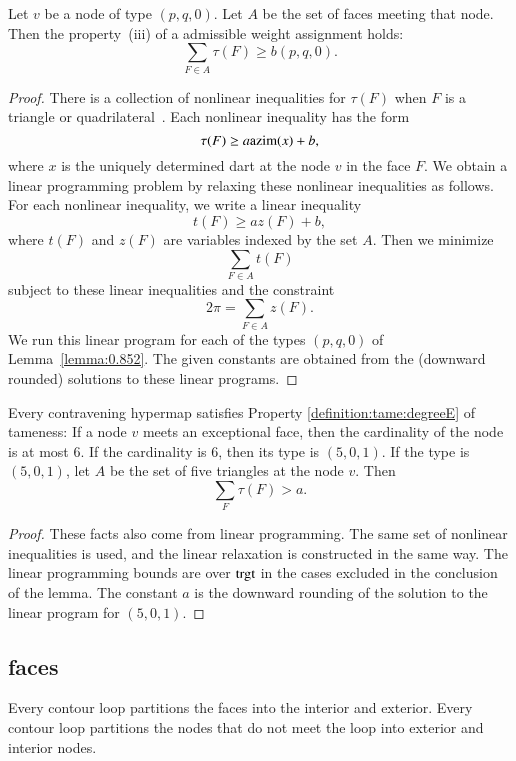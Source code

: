 \begin{lemma} Let $v$ be a node of type $(p,q,0)$.  Let $A$
be the set of faces meeting that node.  Then the property~(iii)
of a admissible weight assignment holds:
$$
\sum_{F\in A} \tau(F) \ge  b(p,q,0).
$$
\end{lemma}

\begin{proof} There is a collection of nonlinear inequalities
for $\tau(F)$ when $F$ is a triangle or quadrilateral~\cite{XX}.
Each nonlinear inequality has the form
$$\tau(F) \ge a {\operatorname{azim}}(x) + b,$$
where $x$ is the uniquely determined dart at the node $v$ in the face $F$.
We obtain a linear programming problem by relaxing these nonlinear
inequalities as follows.  For each nonlinear inequality, we write
a linear inequality
$$
t(F) \ge a z(F) + b,
$$
where $t(F)$ and $z(F)$ are variables indexed by the set $A$.
Then we minimize 
$$\sum_{F\in A} t(F)$$
subject to these linear inequalities and the constraint
$$
2\pi = \sum_{F\in A} z(F).
$$
We run this linear program for each of the types $(p,q,0)$ of Lemma~\ref{lemma:0.852}. The given constants are obtained from the (downward rounded) solutions to these linear programs.
\end{proof}

\begin{lemma} \label{lemma:deg5}
Every contravening hypermap satisfies Property
\ref{definition:tame:degreeE} of tameness: If a node $v$ meets an
exceptional face, then the cardinality of the node is at most $6$.
If the cardinality is $6$, then its type is $(5,0,1)$.
If the type is $(5,0,1)$, let $A$ be the set of five triangles at the
node $v$.  Then
$$
\sum_F \tau(F) > a.
$$
\end{lemma}

\begin{proof} These facts also come from linear programming.
The same set of nonlinear inequalities is used, and the linear
relaxation is constructed in the same way.  The linear programming
bounds are over ${\operatorname{trgt}}$ in the cases excluded in the conclusion
of the lemma.  The constant $a$ is the downward rounding of the solution to the linear program for $(5,0,1)$.
\end{proof}

\subsection{faces}


Every contour loop partitions the faces into the interior and
exterior.  Every contour loop partitions the nodes that do not meet
the loop into exterior and interior nodes.
%


